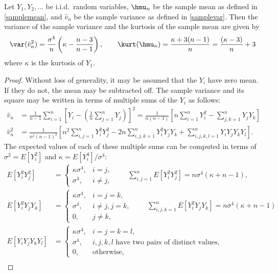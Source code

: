 \documentclass[graybox]{svmult}
\newcommand{\hv}{\hat{v}}
\begin{document}
\begin{theorem} \label{Varvarthm} Let $Y_1, Y_2, \ldots$ be i.i.d.\ random variables,  $\hmu_n$ be the sample mean as defined in \eqref{samplemean}, and $\hv_n$ be the sample variance as defined in \eqref{samplevar}.  Then the variance of the sample variance and the kurtosis of the sample mean are given by 
\[
\var(\hv_n^2) = \frac{\sigma^4}{n} \left ( \kappa  - \frac{n-3}{n-1} \right), \qquad \kurt(\hmu_n) = \frac{\kappa + 3(n-1)}{n} = \frac{(\kappa -3)}{n} + 3
\]
where $\kappa$ is the kurtosis of $Y_1$.
\end{theorem}
\begin{proof} Without loss of generality, it may be assumed that the $Y_i$ have zero mean.  If they do not, the mean may be subtracted off. The sample variance and its square may be written in terms of multiple sums of the $Y_i$ as follows:
\begin{align*}
\hv_n & =  \frac 1{n-1} \sum_{i=1}^n \left[Y_i- \left(\frac 1n \sum_{j=1}^n Y_j\right) \right]^2
=  \frac 1{n(n-1)}\left[ n \sum_{i=1}^n Y^2_i-  \sum_{j,k=1}^n Y_jY_k \right] \\
\hv_n^2 & = \frac 1{n^2(n-1)^2}\left[ n^2 \sum_{i,j=1}^n Y^2_i Y^2_j  - 2 n \sum_{i,j,k=1}^n Y^2_i Y_j Y_k +  \sum_{i,j,k,l=1}^n Y_iY_j Y_k Y_l\right].
\end{align*}
The expected values of each of these multiple sums can be computed in terms of $\sigma^2=E[Y_i^2]$ and $\kappa=E[Y_i^4]/\sigma^4$: 
\begin{align*}
E[ Y^2_i Y^2_j] & = \begin{cases} \kappa \sigma^4, & i=j,\\
\sigma^4, & i \ne j,
\end{cases} \qquad  
\sum_{i,j=1}^n E[Y^2_i Y^2_j] = n\sigma^4 (\kappa + n-1), \\
E[ Y^2_i Y_j Y_k] & = \begin{cases}  \kappa \sigma^4, & i=j=k,\\
\sigma^4, & i \ne j, j=k,\\
0, & j \ne k,
\end{cases}  \qquad  
\sum_{i,j,k=1}^n E[Y^2_i Y_j Y_k] = n\sigma^4 (\kappa + n-1) \\
E[ Y_i Y_j Y_k Y_l] & = \begin{cases} \kappa \sigma^4, & i=j=k=l,\\
\sigma^4, & i, j, k, l \text{ have two pairs of distinct values},\\
0, & \text{otherwise},
\end{cases}\\

\end{align*}
\end{proof}
\end{document}
